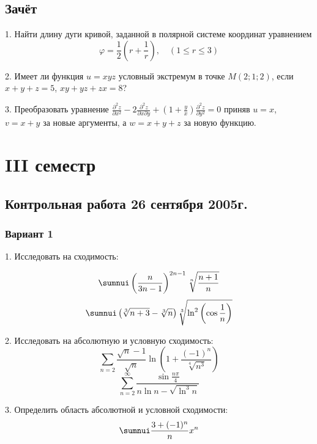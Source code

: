 \documentclass[a4paper]{article}
\newcommand{\No}{\textnumero}
\begin{document}
\subsection{Зачёт \No 2}

1. Найти длину дуги кривой, заданной в полярной системе координат
уравнением
$$
\varphi =\frac{1}{2}\left(r+\frac{1}{r}\right),\quad (1\le r\le
3)
$$

2. Имеет ли функция $u=xyz$ условный экстремум в точке $M(2;1;2)$,
если $x+y+z=5$, $xy+yz+zx=8$?

3. Преобразовать уравнение $\displaystyle
\frac{\partial^2z}{\partial x^2}-2\frac{\partial^2z}{\partial
x\partial y}+\left(1+\frac{y}{x}\right)\frac{\partial^2z}{\partial
y^2}=0$ приняв $u=x$, $v=x+y$ за новые аргументы, а $w=x+y+z$ за
новую функцию.

\section{III семестр}

\subsection{Контрольная работа 26 сентября 2005г.}

\subsubsection{Вариант 1}


1. Исследовать на сходимость:

$$
\sumnui\left(\frac{n}{3n-1}\right)^{2n-1}\sqrt[n]{\frac{n+1}{n}}
$$
$$
\sumnui\left(\sqrt[3]{n+3}-\sqrt[3]{n}\right)\sqrt[3]{\ln^2\left(\cos\frac{1}{n}\right)}
$$

2. Исследовать на абсолютную и условную сходимость:
$$
\sum_{n=2}\frac{\sqrt{n}-1}{\sqrt{n}}\ln\left(1+\frac{(-1)^n}{\sqrt[4]{n^3}}\right)
$$
$$
\sum_{n=2}^\infty\frac{\sin\frac{n\pi}{4}}{n\ln n-\sqrt{\ln^3n}}
$$

3. Определить область абсолютной и условной сходимости:
$$
\sumnui\frac{3+(-1)^n}{n}x^n
$$
\end{document}
